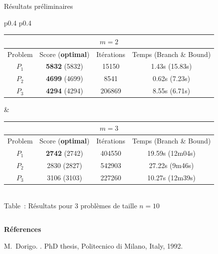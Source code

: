 \documentclass[table]{beamer}
\begin{document}
\begin{frame}{}
\begin{columns}
\begin{column}{.945\paperwidth}
\begin{exampleblock}{Résultats préliminaires}
\begin{center}
\begin{tabular}{p{0.4\linewidth} p{0.4\linewidth}}
            \begin{table}[!h]
              \footnotesize
              \label{tab:n10m2results}
              \begin{tabular}{|c|c|c|c|}
               \hline
               \multicolumn{4}{|c|}{$m=2$} \tabularnewline
               \hline
               Problem & Score (\textbf{optimal}) & Itérations & Temps (Branch \& Bound)\tabularnewline
               \hline
               $P_1$ & \textbf{5832} (5832)& 15150 & 1.43s (15.83s)\tabularnewline
               $P_2$ & \textbf{4699} (4699)& 8541 & 0.62s (7.23s)\tabularnewline
               $P_3$ & \textbf{4294} (4294)& 206869 & 8.55s (6.71s)\tabularnewline
               \hline
               \end{tabular}
            \end{table}
            &
            \begin{table}[!h]
              \label{tab:n10m3results}
              \begin{tabular}{|c|c|c|c|}
               \hline
               \multicolumn{4}{|c|}{$m=3$} \tabularnewline
               \hline
               Problem & Score (\textbf{optimal}) & Itérations & Temps (Branch \& Bound)\tabularnewline
               \hline
               $P_1$ & \textbf{2742} (2742)& 404550 	& 19.59s (12m04s)\tabularnewline
               $P_2$ & 2830 (2827)& 542903 	& 27.22s (9m46s)\tabularnewline
               $P_3$ & 3106 (3103)& 227260 & 10.27s (12m39s)\tabularnewline
               \hline
              \end{tabular}
            \end{table}
           
        \end{tabular}\\
	 \textcolor{bleuL}{Table~:} Résultats pour 3 problèmes de taille $n=10$
	 
         
         \end{center}
      \end{exampleblock}
    \end{column}
  \end{columns}
  \vfill
  \begin{columns}
    \begin{column}{.945\paperwidth}
      \textbf{Réferences}
      \vspace{-20pt}
      {\scriptsize
        
        
        \begin{multicols}{2}
        \begin{thebibliography}{10}	
	  M.~Dorigo.
	  .
	  \newblock PhD thesis, Politecnico di Milano, Italy, 1992.
	  

\end{thebibliography}
\end{multicols}}
\end{column}
\end{columns}
\end{frame}
\end{document}
